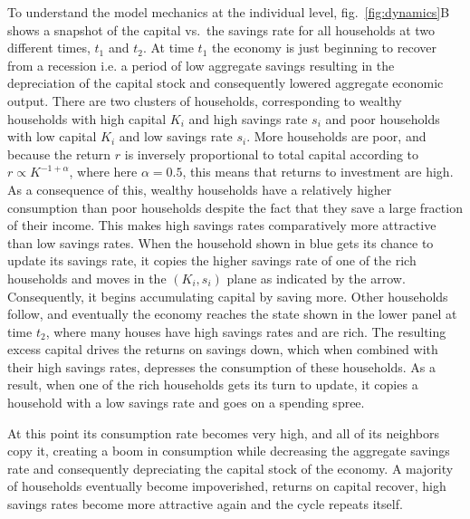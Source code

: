To understand the model mechanics at the individual level, fig.~\ref{fig:dynamics}B shows a snapshot of the capital vs.~the savings rate for all households at two different times, $t_1$ and $t_2$. 
At time $t_1$ the economy is just beginning to recover from a recession i.e. a period of low aggregate savings resulting in the depreciation of the capital stock and consequently lowered aggregate economic output. 
There are two clusters of households, corresponding to wealthy households with high capital $K_i$ and high savings rate $s_i$ and poor households with low capital $K_i$ and low savings rate $s_i$.
More households are poor, and because the return $r$ is inversely proportional to total capital according to $r \propto K^{-1 + \alpha}$, where here $\alpha = 0.5$, this means that returns to investment are high. 
As a consequence of this, wealthy households have a relatively higher consumption than poor households despite the fact that they save a large fraction of their income. This makes high savings rates comparatively more attractive than low savings rates. 
When the household shown in blue gets its chance to update its savings rate, it copies the higher savings rate of one of the rich households and moves in the $(K_i, s_i)$ plane as indicated by the arrow. Consequently, it begins accumulating capital by saving more.
Other households follow, and eventually the economy reaches the state shown in the lower panel at time $t_2$, where many houses have high savings rates and are rich.
The resulting excess capital drives the returns on savings down, which when combined with their high savings rates, depresses the consumption of these households.
As a result, when one of the rich households gets its turn to update, it copies a household with a low savings rate and goes on a spending spree.  

At this point its consumption rate becomes very high, and all of its neighbors copy it, creating a boom in consumption while decreasing the aggregate savings rate and consequently depreciating the capital stock of the economy.
A majority of households eventually become impoverished, returns on capital recover, high savings rates become more attractive again and the cycle repeats itself.
